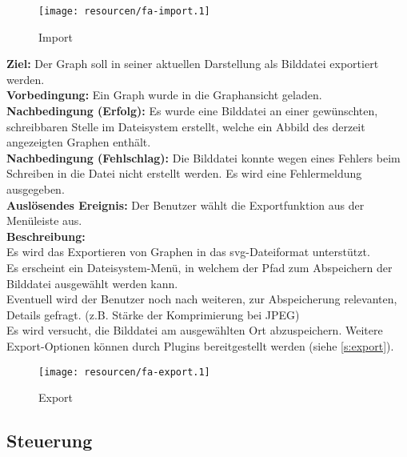 \begin{figure}[ht]
  \centering
  \texttt{[image: resourcen/fa-import.1]}
  \caption{Import}
  \label{fig:import}
\end{figure} %

\label{fa:export_img}
\textbf{Ziel:} Der Graph soll in seiner aktuellen Darstellung als Bilddatei exportiert werden.\\
\textbf{Vorbedingung:} Ein Graph wurde in die Graphansicht geladen. \\
\textbf{Nachbedingung (Erfolg):} Es wurde eine Bilddatei an einer gewünschten, schreibbaren Stelle im Dateisystem erstellt, welche ein Abbild des derzeit angezeigten Graphen enthält.\\
\textbf{Nachbedingung (Fehlschlag):} Die Bilddatei konnte wegen eines Fehlers beim Schreiben in die Datei nicht erstellt werden. Es wird eine Fehlermeldung ausgegeben.\\
\textbf{Auslösendes Ereignis:}
Der Benutzer wählt die Exportfunktion aus der Menüleiste aus.\\
\textbf{Beschreibung:}\\
Es wird das Exportieren von Graphen in das \gls{svg}-Dateiformat unterstützt.\\
Es erscheint ein Dateisystem-Menü, in welchem der Pfad zum Abspeichern der Bilddatei ausgewählt werden kann.\\
Eventuell wird der Benutzer noch nach weiteren, zur Abspeicherung relevanten, Details gefragt. (z.B. Stärke der Komprimierung bei JPEG)\\ %
Es wird versucht, die Bilddatei am ausgewählten Ort abzuspeichern.
Weitere Export-Optionen können durch Plugins bereitgestellt werden (siehe \ref{s:export}).

\begin{figure}[ht]
  \centering
  \texttt{[image: resourcen/fa-export.1]}
  \caption{Export}
  \label{fig:export}
\end{figure}

\subsection{Steuerung}
\setcounter{fanr}{200}

